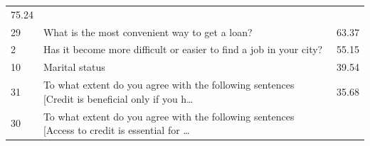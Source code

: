 \begin{longtable}[]{@{}lll@{}}
\begin{minipage}[t]{0.09\columnwidth}
75.24\strut
\end{minipage}\tabularnewline
\begin{minipage}[t]{0.05\columnwidth}\raggedright
29\strut
\end{minipage} & \begin{minipage}[t]{0.77\columnwidth}\raggedright
What is the most convenient way to get a loan?\strut
\end{minipage} & \begin{minipage}[t]{0.09\columnwidth}\raggedright
63.37\strut
\end{minipage}\tabularnewline
\begin{minipage}[t]{0.05\columnwidth}\raggedright
2\strut
\end{minipage} & \begin{minipage}[t]{0.77\columnwidth}\raggedright
Has it become more difficult or easier to find a job in your city?\strut
\end{minipage} & \begin{minipage}[t]{0.09\columnwidth}\raggedright
55.15\strut
\end{minipage}\tabularnewline
\begin{minipage}[t]{0.05\columnwidth}\raggedright
10\strut
\end{minipage} & \begin{minipage}[t]{0.77\columnwidth}\raggedright
Marital status\strut
\end{minipage} & \begin{minipage}[t]{0.09\columnwidth}\raggedright
39.54\strut
\end{minipage}\tabularnewline
\begin{minipage}[t]{0.05\columnwidth}\raggedright
31\strut
\end{minipage} & \begin{minipage}[t]{0.77\columnwidth}\raggedright
To what extent do you agree with the following sentences {[}Credit is
beneficial only if you h\ldots{}\strut
\end{minipage} & \begin{minipage}[t]{0.09\columnwidth}\raggedright
35.68\strut
\end{minipage}\tabularnewline
\begin{minipage}[t]{0.05\columnwidth}\raggedright
30\strut
\end{minipage} & \begin{minipage}[t]{0.77\columnwidth}\raggedright
To what extent do you agree with the following sentences {[}Access to
credit is essential for \ldots{}\strut
\end{minipage} & \begin{minipage}[t]{0.09\columnwidth}\raggedright

\end{minipage}
\end{longtable}
